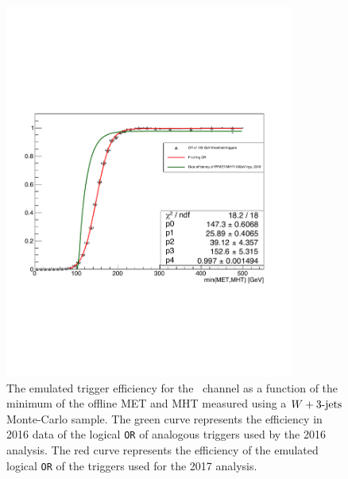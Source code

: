 \begin{figure}[htbp]
  \centering
    \includegraphics[width=3.75in]{images/2017METTriggersMC}
    \caption[Trigger Efficiency for \ZnnHbb\ in 2017 MC]{The emulated trigger efficiency for the \ZnnHbb\ channel as a function of the minimum of the offline MET and MHT measured using a $W + 3\textrm{-jets}$ Monte-Carlo sample. The green curve represents the efficiency in 2016 data of the logical \texttt{OR} of analogous triggers used by the 2016 analysis. The red curve represents the efficiency of the emulated logical \texttt{OR} of the triggers used for the 2017 analysis.}
    \label{fig:triggersmc}
\end{figure}

